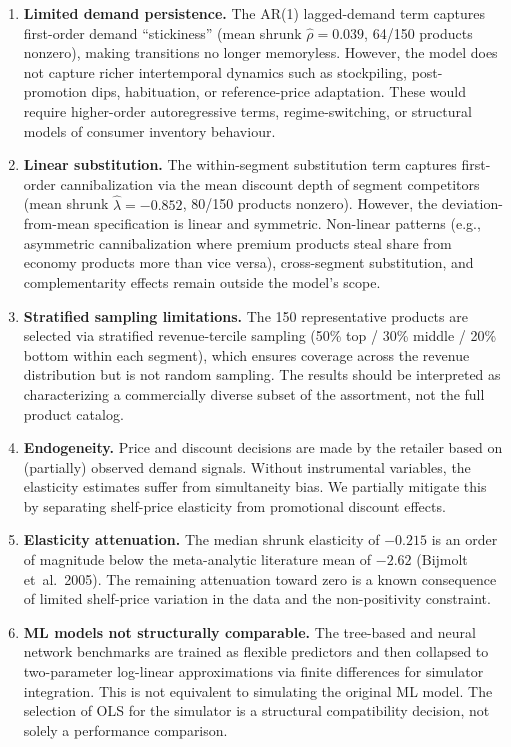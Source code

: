 \documentclass[12pt,a4paper]{article}
\begin{document}
\begin{enumerate}[nosep]
\item \textbf{Limited demand persistence.} The AR(1) lagged-demand
term captures first-order demand ``stickiness'' (mean shrunk
$\hat\rho = 0.039$, 64/150 products nonzero), making transitions
no longer memoryless. However, the model does not capture richer
intertemporal dynamics such as stockpiling, post-promotion dips,
habituation, or reference-price adaptation. These would require
higher-order autoregressive terms, regime-switching, or structural
models of consumer inventory behaviour.

\item \textbf{Linear substitution.} The within-segment substitution
term captures first-order cannibalization via the mean discount
depth of segment competitors (mean shrunk $\hat\lambda = -0.852$,
80/150 products nonzero). However, the deviation-from-mean
specification is linear and symmetric. Non-linear patterns
(e.g., asymmetric cannibalization where premium products steal
share from economy products more than vice versa), cross-segment
substitution, and complementarity effects remain outside the model's
scope.

\item \textbf{Stratified sampling limitations.} The 150
representative products are selected via stratified
revenue-tercile sampling (50\% top / 30\% middle / 20\% bottom
within each segment), which ensures coverage across the revenue
distribution but is not random sampling. The results should be
interpreted as characterizing a commercially diverse subset of
the assortment, not the full product catalog.

\item \textbf{Endogeneity.} Price and discount decisions are made by
the retailer based on (partially) observed demand signals. Without
instrumental variables, the elasticity estimates suffer from
simultaneity bias. We partially mitigate this by separating
shelf-price elasticity from promotional discount effects.

\item \textbf{Elasticity attenuation.} The median shrunk elasticity
of $-0.215$ is an order of magnitude below the meta-analytic
literature mean of $-2.62$ (Bijmolt et~al.\ 2005). The remaining
attenuation toward zero is a known consequence of limited
shelf-price variation in the data and the non-positivity constraint.

\item \textbf{ML models not structurally comparable.} The tree-based
and neural network benchmarks are trained as flexible predictors
and then collapsed to two-parameter log-linear approximations via
finite differences for simulator integration. This is not equivalent
to simulating the original ML model. The selection of OLS for the
simulator is a structural compatibility decision, not solely a
performance comparison.


\end{enumerate}
\end{document}
